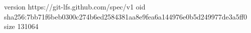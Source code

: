 version https://git-lfs.github.com/spec/v1
oid sha256:7bb71f6beb0300c274b6ed2584381aa8e9fea6a144976e0b5d249977de3a5ff0
size 131064

